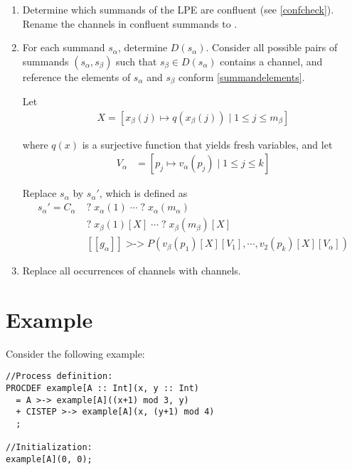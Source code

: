 \begin{enumerate}

\item Determine which \istep{} summands of the LPE are confluent (see \ref{confcheck}).
Rename the \istep{} channels in confluent \istep{} summands to \cistep{}.

\item For each summand $s_\alpha$, determine $D(s_\alpha)$.
Consider all possible pairs of summands $(s_\alpha, s_\beta)$ such that $s_\beta \in D(s_\alpha)$ contains a \cistep{} channel, and reference the elements of $s_\alpha$ and $s_\beta$ conform \ref{summandelements}.

Let
\begin{align*}
X = [ x_\beta(j) \mapsto q(x_\beta(j)) \;|\; 1 \leq j \leq m_\beta ]
\end{align*}

where $q(x)$ is a surjective function that yields fresh variables, and let
\begin{align*}
V_\alpha &= [p_j \mapsto v_\alpha(p_j) \;|\; 1 \leq j \leq k]
\end{align*}

Replace $s_\alpha$ by ${s_\alpha}'$, which is defined as
\begin{align*}
{s_\alpha}' = C_\alpha \; &\texttt{?} \; x_\alpha(1) \; \cdots{} \; \texttt{?} \; x_\alpha(m_\alpha) \\
&\texttt{?} \; x_\beta(1)[X] \; \cdots{} \; \texttt{?} \; x_\beta(m_\beta)[X] \\
&[[g_\alpha]] \; \texttt{>->} \; P(v_\beta(p_1)[X][V_1], \cdots{}, v_2(p_k)[X][V_\alpha])
\end{align*}

\item Replace all occurrences of \cistep{} channels with \istep{} channels.
\end{enumerate}

\section{Example}

Consider the following example:

\begin{lstlisting}
//Process definition:
PROCDEF example[A :: Int](x, y :: Int)
  = A >-> example[A]((x+1) mod 3, y)
  + CISTEP >-> example[A](x, (y+1) mod 4)
  ;

//Initialization:
example[A](0, 0);
\end{lstlisting}

